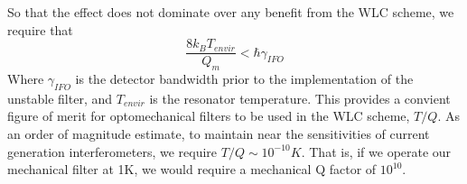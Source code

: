 \documentclass[aps,
                pra,  
                a4paper, 
                amsmath, 
                amssymb, 
                preprint,
                amsfonts,
                nofootinbib,
                titlepage
            ]{revtex4-2}
\begin{document}
    So that the effect does not dominate over any benefit from the WLC scheme, we require that
    \begin{equation}
        \label{eq:thermal-noise}
        \frac{8k_BT_{envir}}{Q_m}<\hbar\gamma_{IFO}
    \end{equation}
    Where $\gamma_{IFO}$ is the detector bandwidth prior to the implementation of the unstable filter, and $T_{envir}$ is the resonator temperature. This provides a convient figure of merit for optomechanical filters to be used in the WLC scheme, $T/Q$. As an order of magnitude estimate, to maintain near the sensitivities of current generation interferometers, we require $T/Q\sim10^{-10}K$. That is, if we operate our mechanical filter at 1K, we would require a mechanical Q factor of $10^{10}$. 
    
\end{document}
